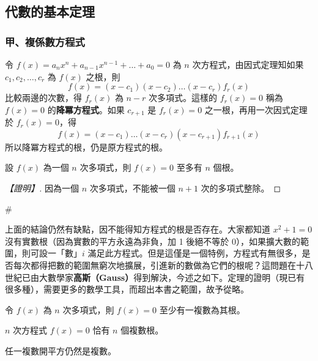 \subsection{代數的基本定理}\label{sec:b6-2-2}
\resetsectcounters

\subsubsection*{甲、複係數方程式}\label{subsec:b6-2-2-a}

令 $f(x) = a_n x^n + a_{n-1} x^{n-1} + \dots + a_0 = 0$ 為 $n$ 次方程式，由因式定理知如果 $c_1, c_2, \dots, c_r$ 為 $f(x)$ 之根，則
\[ f(x) = (x-c_1)(x-c_2)\dots(x-c_r)f_r(x) \]
比較兩邊的次數，得 $f_r(x)$ 為 $n-r$ 次多項式。這樣的 $f_r(x)=0$ 稱為 $f(x)=0$ 的\textbf{降冪方程式}。如果 $c_{r+1}$ 是 $f_r(x)=0$ 之一根，再用一次因式定理於 $f_r(x)=0$，得
\[ f(x) = (x-c_1)\dots(x-c_r)(x-c_{r+1})f_{r+1}(x) \]
所以降冪方程式的根，仍是原方程式的根。

\begin{theorem}\label{thm:b6-2-roots-bound}
設 $f(x)$ 為一個 $n$ 次多項式，則 $f(x)=0$ 至多有 $n$ 個根。
\end{theorem}

\begin{proof}[【證明】]
因為一個 $n$ 次多項式，不能被一個 $n+1$ 次的多項式整除。
\end{proof}\hfill$\#$

上面的結論仍然有缺點，因不能得知方程式的根是否存在。大家都知道 $x^2+1=0$ 沒有實數根（因為實數的平方永遠為非負，加 1 後絕不等於 0），如果擴大數的範圍，則可設一「數」$i$ 滿足此方程式。但是這僅是一個特例，方程式有無很多，是否每次都得把數的範圍無窮次地擴展，引進新的數做為它們的根呢？這問題在十八世紀已由大數學家\textbf{高斯（Gauss）}得到解決，今述之如下。定理的證明（現已有很多種），需要更多的數學工具，而超出本書之範圍，故予從略。

\begin{theorem}[代數的基本定理]\label{thm:b6-2-fta}
令 $f(x)$ 為 $n$ 次多項式，則 $f(x)=0$ 至少有一複數為其根。
\end{theorem}

\begin{corollary}\label{cor:b6-2-n-roots}
$n$ 次方程式 $f(x)=0$ 恰有 $n$ 個複數根。
\end{corollary}

\begin{discussion}\label{disc:b6-2-1}
任一複數開平方仍然是複數。
\end{discussion}

